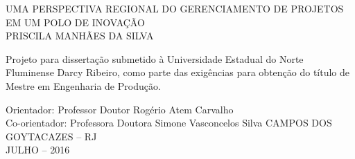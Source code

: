 \begin{titlepage}
 \begin{center}
   {\large UMA PERSPECTIVA REGIONAL DO GERENCIAMENTO DE PROJETOS EM UM POLO DE INOVAÇÃO} \\ [5cm]
   {\large PRISCILA MANHÃES DA SILVA} \\ [1.5cm]
   \hspace{.45\textwidth} %
   \begin{minipage}{0.5\textwidth}
   \begin{espacosimples}
        Projeto para dissertação submetido à Universidade Estadual do Norte Fluminense Darcy Ribeiro, como parte das exigências para obtenção do título de Mestre em Engenharia de Produção. \\[5cm]
    \end{espacosimples}
    \end{minipage}
    {\normalsize Orientador: Professor Doutor Rogério Atem Carvalho}\\
    {\normalsize Co-orientador: Professora Doutora Simone Vasconcelos Silva}
   \vfill
   {\large CAMPOS DOS GOYTACAZES – RJ} \\
   {\large JULHO – 2016}
 \end{center}
\end{titlepage}
